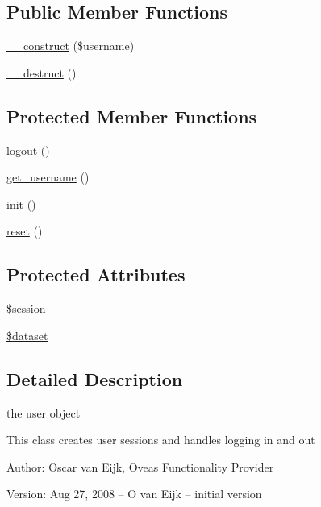 \subsection*{Public Member Functions}
\begin{CompactItemize}
\item 
\hyperlink{classUserHandler_624054e9693139a3fe5af0ef3b757f04}{\_\-\_\-construct} (\$username)
\item 
\hyperlink{classUserHandler_3e1f6381ed79caf6e1a255fb0a9cc386}{\_\-\_\-destruct} ()
\end{CompactItemize}
\subsection*{Protected Member Functions}
\begin{CompactItemize}
\item 
\hyperlink{classUserHandler_8000feaceda9d3c37fc56b6d1969b8f7}{logout} ()
\item 
\hyperlink{classUserHandler_76e8c8b88c8d92f2d03645e810b9253c}{get\_\-username} ()
\item 
\hyperlink{class__OWL_e0ef3ded56e8a6b34b6461e5a721cd3e}{init} ()
\item 
\hyperlink{class__OWL_2f2a042bcf31965194c03033df0edc9b}{reset} ()
\end{CompactItemize}
\subsection*{Protected Attributes}
\begin{CompactItemize}
\item 
\hyperlink{classUserHandler_f097b7fd1ee085b46a6c34e071508a7f}{\$session}
\item 
\hyperlink{classUserHandler_c38c1ea50b2820ed03781bdbe8eb2e08}{\$dataset}
\end{CompactItemize}


\subsection{Detailed Description}
the user object 

This class creates user sessions and handles logging in and out \begin{Desc}
\item[Author:]Oscar van Eijk, Oveas Functionality Provider \end{Desc}
\begin{Desc}
\item[Version:]Aug 27, 2008 -- O van Eijk -- initial version \end{Desc}



